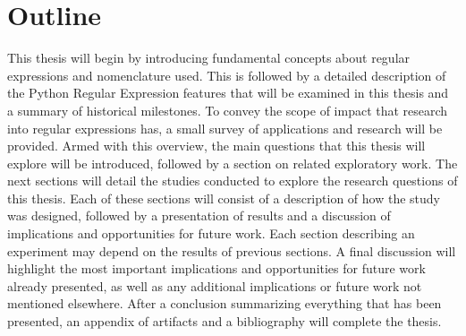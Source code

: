 \section{Outline}


This thesis will begin by introducing fundamental concepts about regular expressions and nomenclature used.  This is followed by a detailed description of the Python Regular Expression features that will be examined in this thesis and a summary of historical milestones.  To convey the scope of impact that research into regular expressions has, a small survey of applications and research will be provided.  Armed with this overview, the main questions that this thesis will explore will be introduced, followed by a section on related exploratory work.  The next  sections will detail the studies conducted to explore the research questions of this thesis.  Each of these sections will consist of a description of how the study was designed, followed by a presentation of results and a discussion of implications and opportunities for future work.
Each section describing an experiment may depend on the results of previous sections.  A final discussion will highlight the most important implications and opportunities for future work already presented, as well as any additional implications or future work not mentioned elsewhere.  After a conclusion summarizing everything that has been presented, an appendix of artifacts and a bibliography will complete the thesis.
